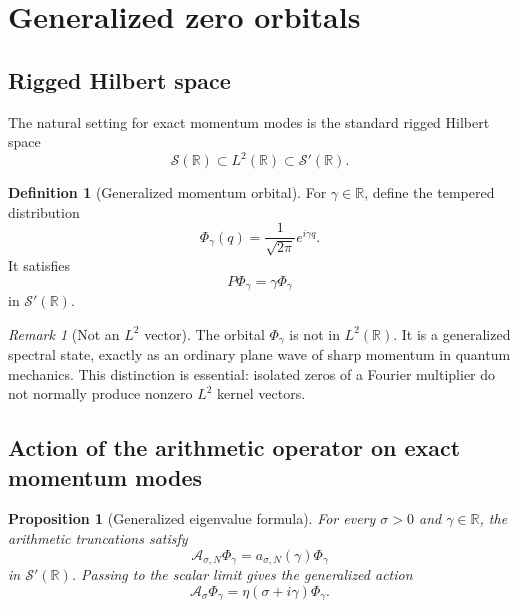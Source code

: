 \documentclass[11pt]{amsart}
\numberwithin{equation}{section}
\theoremstyle{plain}
\newtheorem{proposition}[theorem]{Proposition}
\theoremstyle{definition}
\newtheorem{definition}[theorem]{Definition}
\theoremstyle{remark}
\newtheorem{remark}[theorem]{Remark}
\newcommand{\R}{\mathbb{R}}
\newcommand{\Sch}{\mathcal{S}}
\begin{document}
\section{Generalized zero orbitals}
\label{sec:zero_orbitals}

\subsection{Rigged Hilbert space}
\label{subsec:rigged_hilbert}

The natural setting for exact momentum modes is the standard rigged Hilbert
space
\begin{equation}
\Sch(\R)
\subset
L^2(\R)
\subset
\Sch'(\R).
\label{eq:rigged_hilbert_space}
\end{equation}

\begin{definition}[Generalized momentum orbital]
\label{def:momentum_orbital}
For $\gamma\in\R$, define the tempered distribution
\begin{equation}
\Phi_\gamma(q)
=\frac{1}{\sqrt{2\pi}}e^{i\gamma q}.
\label{eq:plane_wave_orbital}
\end{equation}
It satisfies
\begin{equation}
P\Phi_\gamma=\gamma\Phi_\gamma
\label{eq:plane_wave_momentum_eigenstate}
\end{equation}
in $\Sch'(\R)$.
\end{definition}

\begin{remark}[Not an $L^2$ vector]
\label{rem:plane_wave_not_L2}
The orbital $\Phi_\gamma$ is not in $L^2(\R)$.  It is a generalized spectral
state, exactly as an ordinary plane wave of sharp momentum in quantum
mechanics.  This distinction is essential: isolated zeros of a Fourier
multiplier do not normally produce nonzero $L^2$ kernel vectors.
\end{remark}

\subsection{Action of the arithmetic operator on exact momentum modes}
\label{subsec:eta_on_plane_waves}

\begin{proposition}[Generalized eigenvalue formula]
\label{prop:eta_plane_wave_eigenvalue}
For every $\sigma>0$ and $\gamma\in\R$, the arithmetic truncations satisfy
\begin{equation}
\mathcal A_{\sigma,N}\Phi_\gamma
=a_{\sigma,N}(\gamma)\Phi_\gamma
\label{eq:eta_truncation_plane_wave}
\end{equation}
in $\Sch'(\R)$.  Passing to the scalar limit gives the generalized action
\begin{equation}
\mathcal A_\sigma\Phi_\gamma
=\eta(\sigma+i\gamma)\Phi_\gamma.
\label{eq:eta_plane_wave_eigenvalue}
\end{equation}
\end{proposition}
\end{document}
